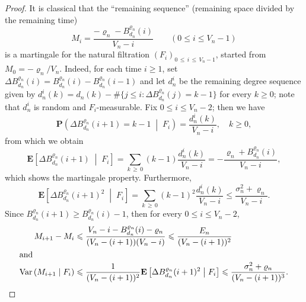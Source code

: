 \documentclass[AHL,Unicode,longabstracts,published]{cedram}
\newcommand{\ensembles}[1]{\mathbf{#1}}
\renewcommand{\P}{\ensembles{P}}
\newcommand{\E}{\ensembles{E}}
\newcommand{\Prc}[2]{\P\left(#1 \;\middle|\; #2\right)}
\newcommand{\Esc}[2]{\E\left[#1 \;\middle|\; #2\right]}
\newcommand{\1}{\ensembles{1}}
\renewcommand{\le}{\leqslant}
\renewcommand{\ge}{\geqslant}
\newcommand{\Var}{\mathrm{Var}}
\newcommand{\Bfn}{B_{d_n}^{\varrho_n}}
\newcommand{\edges}{E}
\newcommand{\vertices}{V}
\begin{document}
\begin{proof}
It is classical that the ``remaining sequence'' (remaining space divided by the remaining time)
\[
M_i = \frac{- \varrho_n - \Bfn(i)}{\vertices_n-i}
\qquad \left(0 \le i \le \vertices_n - 1\right)
\]
is a martingale for the natural filtration $(F_i)_{0\, \le\,i\,\le\,\vertices_n - 1}$, started from $M_0 = -\varrho_n / \vertices_n$. Indeed, for each time $i \ge 1$, set $\Delta\Bfn(i) = \Bfn(i) - \Bfn(i-1)$ and let $d_n^{i}$ be the remaining degree sequence given by $d_n^{i}(k) = d_n(k) - \#\{j \le i : \Delta\Bfn(j) = k-1\}$ for every $k \ge 0$; note that $d_n^{i}$ is random and $F_i$-measurable. Fix $0 \le i \le \vertices_n-2$; then we have
\[
\Prc{\Delta\Bfn(i+1) = k-1}{F_i} = \frac{d_n^{i}(k)}{\vertices_n-i},\quad k \ge 0,
\]
from which we obtain
\[
\Esc{\Delta\Bfn(i+1)}{F_i} = \sum_{k\,\ge\,0} (k-1) \frac{d_n^{i}(k)}{\vertices_n-i} = - \frac{\varrho_n + \Bfn(i)}{\vertices_n-i},
\]
which shows the martingale property. Furthermore,
\[
\Esc{\Delta\Bfn(i+1)^2}{F_i} = \sum_{k\,\ge\,0} (k-1)^2 \frac{d_n^{i}(k)}{\vertices_n-i}
\le \frac{\sigma_n^2+\varrho_n}{\vertices_n-i}.
\]
Since $\Bfn(i+1) \ge \Bfn(i) - 1$, then for every $0 \le i \le \vertices_n - 2$,
\begin{align*}
M_{i+1} - M_i
&\le \frac{\vertices_n-i - \Bfn(i) - \varrho_n}{(\vertices_n-(i+1)) (\vertices_n-i)}
\le \frac{\edges_n}{(\vertices_n-(i+1))^2}
\\
\intertext{and}
\Var\left(M_{i+1} \mid F_i\right)
&\le \frac{1}{(\vertices_n-(i+1))^2} \Esc{\Delta\Bfn(i+1)^2}{F_i}
\le \frac{\sigma_n^2 + \varrho_n}{(\vertices_n-(i+1))^3}.
\end{align*}




\end{proof}
\end{document}
